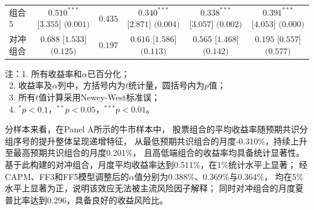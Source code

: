 {\begin{table}[!htbp]
\begin{tabularx}{\textwidth}{l C C C C C}
    组合5 &  &  &  &  &  \\
    对冲组合 &  &  &  &  &  \\
    \bottomrule
  \end{tabularx}

  \vspace{0.5em}
  \begin{minipage}{\textwidth}
  \footnotesize
  注：1. 所有收益率和$\alpha$已百分化；\\
  \quad\ 2. 收益率及$\alpha$列中，方括号内为$t$统计量，圆括号内为$p$值；\\
  \quad\ 3. 所有$t$值计算采用Newey-West标准误；\\
  \quad\ 4. $^{*}p<0.1$，$^{**}p<0.05$，$^{***}p<0.01$。
  \end{minipage}
\end{table}
}

分样本来看，在Panel A所示的牛市样本中，
股票组合的平均收益率随预期共识分组序号的提升整体呈现递增特征，
从最低预期共识组合的月度-0.310\%，持续上升至最高预期共识组合的月度0.201\%，
且高低端组合的收益率均具备统计显著性。
基于此构建的对冲组合，月度平均收益率达到0.511\%，在1\%统计水平上显著；
经CAPM、FF3和FF5模型调整后的$\alpha$值分别为0.388\%、0.369\%与0.364\%，
均在5\%水平上显著为正，说明该效应无法被主流风险因子解释；
同时对冲组合的月度夏普比率达到0.296，具备良好的收益风险比。


